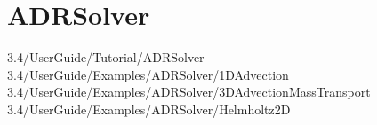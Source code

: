 \section{ADRSolver}
3.4/UserGuide/Tutorial/ADRSolver
3.4/UserGuide/Examples/ADRSolver/1DAdvection
3.4/UserGuide/Examples/ADRSolver/3DAdvectionMassTransport
3.4/UserGuide/Examples/ADRSolver/Helmholtz2D
